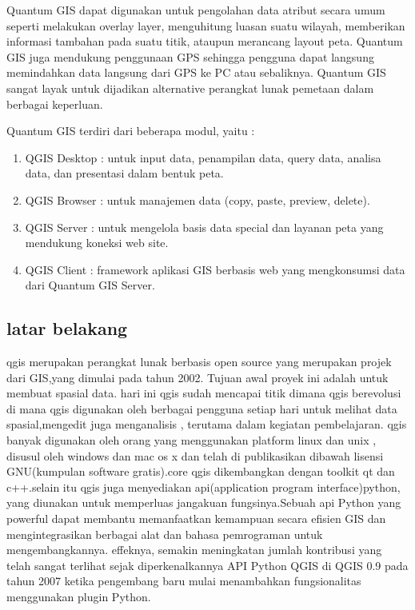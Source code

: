 	Quantum GIS dapat digunakan untuk pengolahan data atribut secara umum seperti melakukan overlay layer, menguhitung luasan suatu wilayah, memberikan informasi tambahan pada suatu titik, ataupun merancang layout peta. Quantum GIS juga mendukung penggunaan GPS sehingga pengguna dapat langsung memindahkan data langsung dari GPS ke PC atau sebaliknya. Quantum GIS sangat layak untuk dijadikan alternative perangkat lunak pemetaan dalam berbagai keperluan.

	Quantum GIS terdiri dari beberapa modul, yaitu :
	\begin{enumerate}
		\item QGIS Desktop : untuk input data, penampilan data, query data, analisa data, dan presentasi dalam bentuk peta.
		\item QGIS Browser : untuk manajemen data (copy, paste, preview, delete).
		\item QGIS Server : untuk mengelola basis data special dan layanan peta yang mendukung koneksi web site.
		\item QGIS Client : framework aplikasi GIS berbasis web yang mengkonsumsi data dari Quantum GIS Server.
	\end{enumerate}

	 \subsection{latar belakang}
		qgis merupakan perangkat lunak berbasis open source yang merupakan projek dari GIS,yang dimulai pada tahun 2002. Tujuan awal proyek ini adalah untuk membuat spasial data. hari ini qgis sudah mencapai titik dimana qgis berevolusi di mana qgis digunakan oleh berbagai pengguna setiap hari untuk melihat data spasial,mengedit juga menganalisis , terutama dalam kegiatan pembelajaran.
	 qgis banyak digunakan oleh orang yang menggunakan platform linux dan unix , disusul oleh windows dan mac os x dan telah di publikasikan dibawah lisensi GNU(kumpulan software gratis).core qgis dikembangkan dengan toolkit qt dan c++.selain itu qgis juga menyediakan api(application program interface)python, yang diunakan untuk memperluas jangakuan fungsinya.Sebuah api Python yang powerful dapat membantu memanfaatkan kemampuan secara efisien GIS dan mengintegrasikan berbagai alat dan bahasa pemrograman untuk mengembangkannya.
	 effeknya, semakin meningkatan jumlah kontribusi yang telah sangat terlihat sejak diperkenalkannya API Python QGIS di QGIS 0.9 pada tahun 2007 ketika pengembang baru mulai menambahkan fungsionalitas menggunakan plugin Python.

